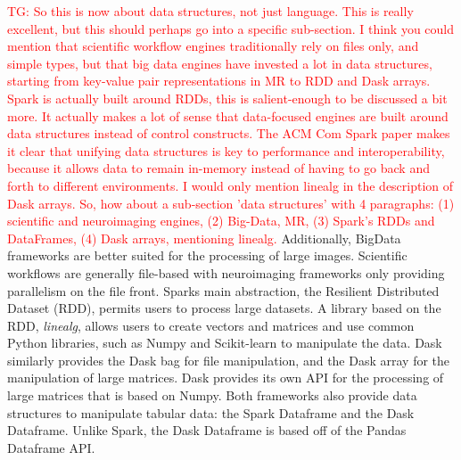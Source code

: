 \documentclass{report}
\newcommand{\tristan}[1]{\textcolor{red}{TG: #1}}
\begin{document}
            \tristan{So this is now about data structures, not just language.
            This is really excellent, but this should perhaps go into a 
            specific sub-section. I think you could mention that 
            scientific workflow engines traditionally rely on files 
            only, and simple types, but that big data engines have 
            invested a lot in data structures, starting from key-value 
            pair representations in MR to RDD and Dask arrays. Spark is 
            actually built around RDDs, this is salient-enough to be 
            discussed a bit more. It actually makes a lot of sense that 
            data-focused engines are built around data structures 
            instead of control constructs. The ACM Com Spark paper makes it clear
            that unifying data structures is key to performance and interoperability, 
            because it allows data to remain in-memory instead of having to go back
            and forth to different environments. I would only mention linealg 
            in the description of Dask arrays. So, how about a 
            sub-section 'data structures' with 4 paragraphs: (1) 
            scientific and neuroimaging engines, (2) Big-Data, MR, (3) 
            Spark's RDDs and DataFrames, (4) Dask arrays, mentioning 
            linealg. } Additionally, BigData frameworks are better 
            suited for the 
            processing of large images. Scientific workflows are generally 
            file-based with neuroimaging frameworks only providing parallelism
            on the file front. Sparks main abstraction, the Resilient 
            Distributed Dataset (RDD), permits users to process large datasets.
            A library based on the RDD, \textit{linealg}, allows users to create
            vectors and matrices and use common Python libraries, such as 
            Numpy and Scikit-learn to manipulate the data. Dask similarly 
            provides the Dask bag for file manipulation, and the Dask array for
            the manipulation of large matrices. Dask provides its own API for
            the processing of large matrices that is based on Numpy. 
            Both frameworks also provide data structures to manipulate tabular
            data: the Spark Dataframe and the Dask Dataframe. Unlike Spark, the
            Dask Dataframe is based off of the Pandas Dataframe API.
\end{document}
